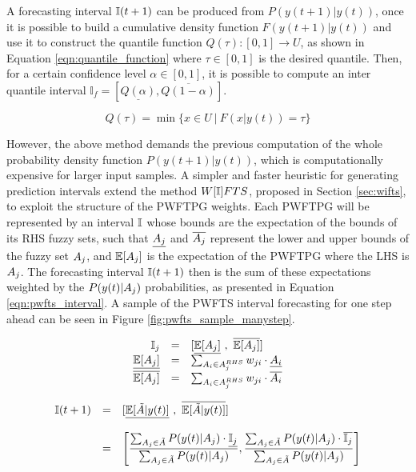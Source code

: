 A forecasting interval $\mathbb{I} (t+1)$ can be produced from $P( y(t+1) | y(t))$, once it is possible to build a cumulative density function $F( y(t+1) | y(t))$ and use it to construct the quantile function $Q(\tau): [0,1] \rightarrow U$, as shown in Equation \ref{eqn:quantile_function} where $\tau \in [0,1]$ is the desired quantile. Then, for a certain confidence level $\alpha \in [0,1]$, it is possible to compute an inter quantile interval $\mathbb{I}_f = [\underline{Q(\alpha)}, \overline{Q(1 - \alpha)}]$.

\begin{equation}
Q(\tau) = \min\{x \in U\ |\ F(x | y(t)) = \tau \}
\label{eqn:quantile_function}
\end{equation}

However, the above method demands the previous computation of the whole probability density function $P( y(t+1) | y(t))$, which is computationally expensive for larger input samples. A simpler and faster heuristic for generating prediction intervals extend the method $W[\mathbb{I}]FTS$, proposed in Section \ref{sec:wifts}, to exploit the structure of the PWFTPG weights. Each PWFTPG will be represented by an interval $\mathbb{I}$ whose bounds are the expectation of the bounds of its RHS fuzzy sets, such that $\underline{A_j}$ and $\overline{A_j}$ represent the lower and upper bounds of the fuzzy set $A_j$, and $\mathbb{E}[ A_j ]$ is the expectation of the PWFTPG where the LHS is $A_j$. The forecasting interval  $\mathbb{I}(t+1)$ then is the sum of these expectations weighted by the $P(y(t)|A_j)$ probabilities, as presented in Equation \ref{eqn:pwfts_interval}. A sample of the PWFTS interval forecasting for one step ahead can be seen in Figure \ref{fig:pwfts_sample_manystep}.

\begin{equation}
\begin{array}{rcl}
\intvl_j & = & \displaystyle [\underline{\mathbb{E}[ \ufset ]}\ ,\ \overline{\mathbb{E}[ \ufset ]}] \\
\underline{\mathbb{E}[ \ufset ]} & = & \sum_{A_i \in \ufset^{RHS}} w_{ji}\cdot \underline{A_i} \\ 
\overline{\mathbb{E}[ \ufset ]} & = & \sum_{A_i \in \ufset^{RHS}} w_{ji}\cdot \overline{A_i}
\end{array}
\end{equation}

\begin{equation}
\begin{array}{rcl}
\mathbb{I}(t+1) & = & \displaystyle [\underline{\mathbb{E}[ \tilde{A} | y(t) ]}\ ,\ \overline{\mathbb{E}[ \tilde{A} | y(t) ]}] \\
& & \\
& = & \displaystyle \left[\frac{\sum_{A_j \in \tilde{A}} P(y(t)|A_j)\cdot \underline{\mathbb{I}_j}}{\sum_{A_j \in \tilde{A}} P(y(t)|A_j)},\frac{\sum_{A_j \in \tilde{A}} P(y(t)|A_j)\cdot \overline{\mathbb{I}_j}}{\sum_{A_j \in \tilde{A}} P(y(t)|A_j)}\right]
\end{array}
\label{eqn:pwfts_interval}
\end{equation}

